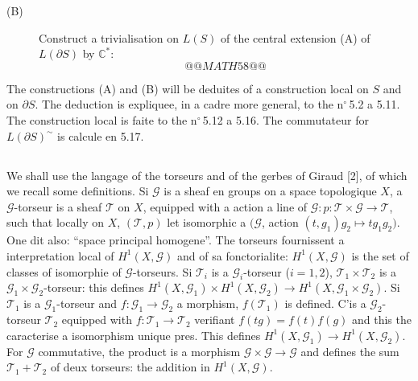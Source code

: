 \documentclass[12pt,a4paper]{article}
\theoremstyle{plain}
\theoremstyle{definition}
\theoremstyle{remark}
\newcommand{\C}{\mathbb{C}}
\begin{document}
\begin{description}
\item[(B)] Construct a trivialisation on $L(S)$ of the central extension (A) of $L(\partial S)$
by $\C^*$:
\[
@@MATH58@@
\]
\end{description}

The constructions (A) and (B) will be deduites of a construction local on $S$ and on $\partial S$. The
deduction is expliquee, in a cadre more general, to the n${}^\circ$\,5.2 a 5.11. The construction
local is faite to the n${}^\circ$\,5.12 a 5.16. The commutateur for $L(\partial S)^\sim$ is calcule en 5.17.

\subsection{}

We shall use the langage of the torseurs and of the gerbes of Giraud [2], of which
we recall some definitions. Si $\mathscr{G}$ is a sheaf en groups on a space
topologique $X$, a $\mathscr{G}$-torseur is a sheaf $\mathscr{T}$ on $X$, equipped with a action a line of
$\mathscr{G} : p : \mathscr{T} \times \mathscr{G} \to \mathscr{T}$, such that locally on $X$, $(\mathscr{T}, p)$ let isomorphic a $(\mathscr{G}$, action
$(t, g_1)g_2 \mapsto tg_1g_2)$. One dit also: ``space principal homogene''. The torseurs fournissent
a interpretation local of $H^1(X, \mathscr{G})$ and of sa fonctorialite: $H^1(X, \mathscr{G})$ is the set
of classes of isomorphie of $\mathscr{G}$-torseurs. Si $\mathscr{T}_i$ is a $\mathscr{G}_i$-torseur ($i = 1, 2$), $\mathscr{T}_1 \times \mathscr{T}_2$
is a $\mathscr{G}_1 \times \mathscr{G}_2$-torseur: this defines $H^1(X, \mathscr{G}_1) \times H^1(X, \mathscr{G}_2) \to H^1(X, \mathscr{G}_1 \times \mathscr{G}_2)$.
Si $\mathscr{T}_1$ is a $\mathscr{G}_1$-torseur and $f : \mathscr{G}_1 \to \mathscr{G}_2$ a morphism, $f(\mathscr{T}_1)$ is defined. C'is a $\mathscr{G}_2$-torseur
$\mathscr{T}_2$ equipped with $f : \mathscr{T}_1 \to \mathscr{T}_2$ verifiant $f(tg) = f(t)f(g)$ and this the caracterise a isomorphism
unique pres. This defines $H^1(X, \mathscr{G}_1) \to H^1(X, \mathscr{G}_2)$. For $\mathscr{G}$ commutative, the product is
a morphism $\mathscr{G} \times \mathscr{G} \to \mathscr{G}$ and defines the sum $\mathscr{T}_1 + \mathscr{T}_2$ of deux torseurs: the addition
in $H^1(X, \mathscr{G})$.

\subsection{}
\end{document}
